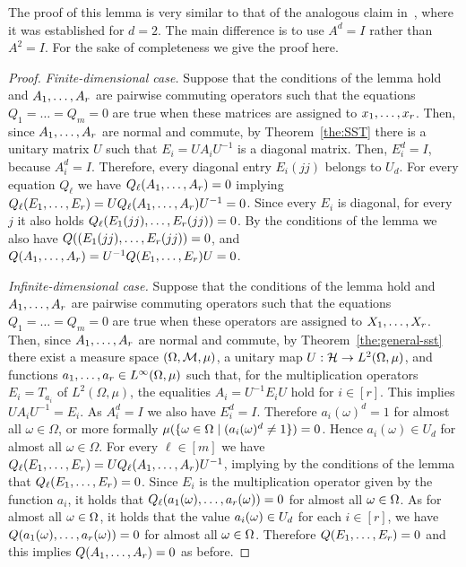 The proof of this lemma is very similar to that of the analogous claim
in~\cite[Lemma~3]{AKS19:jcss}, where it was established for $d=2$.
The main difference is to 
use $A^d=I$ rather than $A^2=I$. For the sake of completeness we give the proof here.

\noindent\begin{proof}
%
{\it Finite-dimensional case.}
Suppose that the conditions of the lemma hold and $A _1,\ldots, A _{r}$ are pairwise
  commuting operators such that the equations $Q_1=\dots=Q_m=0$ are
  true when these matrices are assigned to $x _1,\ldots, x _{r}$. Then, since $A _1,\ldots, A _{r}$ are
  normal and commute, by Theorem~\ref{the:SST} there is a unitary matrix $U$
  such that $E_i=UA_iU^{-1}$ is a diagonal matrix. Then, $E_i^d=I$, because $A_i^d=I$. Therefore, every diagonal entry $E_i(jj)$ belongs to $U_d$. For every equation $Q_\ell$ we have $Q_\ell(A _1,\ldots, A _{r})=0$ implying
  $Q_\ell(E _1,\ldots, E _{r})=UQ_\ell(A _1,\ldots, A _{r})U^{-1}=0$. Since every $E_i$ is diagonal, for every $j$ it also holds $Q_\ell(E_1(jj),\ldots, E_r(jj))=0$. By the conditions of the lemma we also have $Q((E_1(jj),\ldots, E_r(jj))=0$, and $Q(A _1,\ldots, A _{r})=U^{-1}Q(E _1,\ldots, E _{r})U=0$.
%

\smallskip

{\it Infinite-dimensional case.}
Suppose that the conditions of the lemma hold and $A _1,\ldots, A _{r}$ are pairwise commuting  operators such that the equations $Q_1=\dots=Q_m=0$ are true when these operators are assigned to $X _1,\ldots, X _{r}$. Then, since $A _1,\ldots, A _{r}$ are normal and commute, by  Theorem~\ref{the:general-sst} there exist a measure space $(\Omega,{\mathcal M},\mu)$, a unitary map $U:{\mathcal H}\to L^2(\Omega,\mu)$, and functions $a _1,\ldots, a _{r}\in L^\infty(\Omega,\mu)$ such that, for the multiplication operators $E_i=T_{a_i}$ of $L^2(\Omega,\mu)$, the equalities $A_i=U^{-1}E_iU$ hold for $i\in[r]$. This implies $UA_iU^{-1}=E_i$. As $A_i^d=I$ we also have $E_i^d=I$. Therefore $a_i(\omega)^d=1$ for almost all $\omega\in\Omega$, or more formally $\mu(\{\omega\in\Omega\mid (a_i(\omega)^d\ne1\})=0$. Hence $a_i(\omega)\in U_d$ for almost all $\omega\in\Omega$. For every $\ell\in[m]$ we have $Q_\ell(E _1,\ldots, E _{r})=UQ_\ell(A _1,\ldots, A _{r})U^{-1}$, implying by the conditions of the lemma that $Q_\ell(E _1,\ldots, E _{r})=0$. Since $E_i$ is the multiplication operator given by the function $a_i$, it holds that $Q_\ell(a_1(\omega),\ldots, a_r(\omega))=0$ for almost all $\omega\in\Omega$. As for almost all $\omega\in\Omega$, it holds that the value $a_i(\omega)\in U_d$ for each $i\in[r]$, we have $Q(a_1(\omega),\ldots, a_r(\omega))=0$ for almost all $\omega\in\Omega$. Therefore $Q(E _1,\ldots, E _{r})=0$ and this implies $Q(A _1,\ldots, A _{r})=0$ as before.
%
\end{proof}


